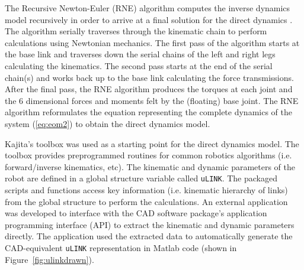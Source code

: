 The Recursive Newton-Euler (RNE) algorithm computes the inverse dynamics model recursively in order to arrive at a final solution for the direct dynamics \cite{Perrin:1997wn}. The algorithm serially traverses through the kinematic chain to perform calculations using Newtonian mechanics. The first pass of the algorithm starts at the base link and traverses down the serial chains of the left and right legs calculating the kinematics. The second pass starts at the end of the serial chain(s) and works back up to the base link calculating the force transmissions. After the final pass, the RNE algorithm produces the torques at each joint and the 6 dimensional forces and moments felt by the (floating) base joint. The RNE algorithm reformulates the equation representing the complete dynamics of the system (\ref{eq:eom2}) to obtain the direct dynamics model. 

Kajita's toolbox \cite{kajitatxt} was used as a starting point for the direct dynamics model. The toolbox provides preprogrammed routines for common robotics algorithms (i.e. forward/inverse kinematics, etc). The kinematic and dynamic parameters of the robot are defined in a global structure variable called \texttt{uLINK}. The packaged scripts and functions access key information (i.e. kinematic hierarchy of links) from the global structure to perform the calculations. An external application was developed to interface with the CAD software package's application programming interface (API) to extract the kinematic and dynamic parameters directly. The application used the extracted data to automatically generate the CAD-equivalent \texttt{uLINK} representation in Matlab code (shown in Figure~\ref{fig:ulinkdrawn}).


